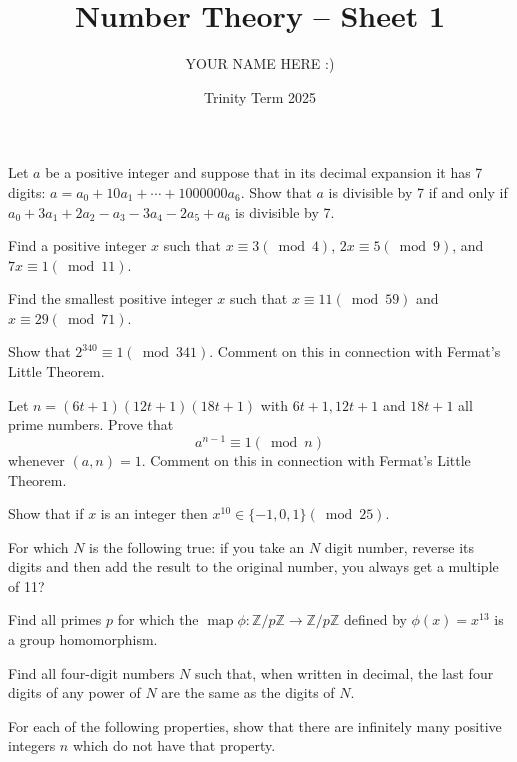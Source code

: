 \documentclass[answers]{exam}
\title{Number Theory -- Sheet 1}
\author{YOUR NAME HERE :)}
\date{Trinity Term 2025}
\begin{document}
\maketitle
\begin{questions}

\question%
Let $a$ be a positive integer and suppose that in its decimal expansion it has 7 digits: $a=a_0+10 a_1+\cdots+1000000 a_6$. Show that $a$ is divisible by 7 if and only if $a_0+3 a_1+2 a_2-a_3-3 a_4-2 a_5+a_6$ is divisible by 7.



\question%
Find a positive integer $x$ such that $x \equiv 3(\bmod 4)$, $2 x \equiv 5(\bmod 9)$, and $7 x \equiv 1(\bmod 11)$.



\question%
Find the smallest positive integer $x$ such that $x \equiv 11(\bmod 59)$ and $x \equiv29(\bmod 71)$.



\question%
Show that $2^{340} \equiv 1(\bmod 341)$. Comment on this in connection with Fermat's Little Theorem.



\question%
Let $n=(6 t+1)(12 t+1)(18 t+1)$ with $6 t+1,12 t+1$ and $18 t+1$ all prime numbers. Prove that \[
	a^{n-1} \equiv 1(\bmod n)
\] whenever $(a, n)=1$. Comment on this in connection with Fermat's Little Theorem.


\question%
Show that if $x$ is an integer then $x^{10} \in\{-1,0,1\}(\bmod 25)$.



\question%
For which $N$ is the following true: if you take an $N$ digit number, reverse its digits and then add the result to the original number, you always get a multiple of 11?



\question%
Find all primes $p$ for which the $\operatorname{map} \phi: \mathbb{Z} / p \mathbb{Z} \to \mathbb{Z} / p \mathbb{Z}$ defined by $\phi(x)=x^{13}$ is a group homomorphism.



\question%
Find all four-digit numbers $N$ such that, when written in decimal, the last four digits of any power of $N$ are the same as the digits of $N$.



\question%
For each of the following properties, show that there are infinitely many positive integers $n$ which do not have that property.
\end{questions}
\end{document}

